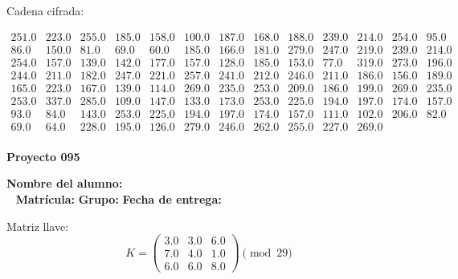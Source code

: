 \documentclass[12pt]{article}
\begin{document}
Cadena cifrada:
\begin{center}
$\begin{array}{lllllllllllll}
251.0 & 223.0 & 255.0 & 185.0 & 158.0 & 100.0 & 187.0 & 168.0 & 188.0 & 239.0 & 214.0 & 254.0 & 95.0\\
86.0 & 150.0 & 81.0 & 69.0 & 60.0 & 185.0 & 166.0 & 181.0 & 279.0 & 247.0 & 219.0 & 239.0 & 214.0\\
254.0 & 157.0 & 139.0 & 142.0 & 177.0 & 157.0 & 128.0 & 185.0 & 153.0 & 77.0 & 319.0 & 273.0 & 196.0\\
244.0 & 211.0 & 182.0 & 247.0 & 221.0 & 257.0 & 241.0 & 212.0 & 246.0 & 211.0 & 186.0 & 156.0 & 189.0\\
165.0 & 223.0 & 167.0 & 139.0 & 114.0 & 269.0 & 235.0 & 253.0 & 209.0 & 186.0 & 199.0 & 269.0 & 235.0\\
253.0 & 337.0 & 285.0 & 109.0 & 147.0 & 133.0 & 173.0 & 253.0 & 225.0 & 194.0 & 197.0 & 174.0 & 157.0\\
93.0 & 84.0 & 143.0 & 253.0 & 225.0 & 194.0 & 197.0 & 174.0 & 157.0 & 111.0 & 102.0 & 206.0 & 82.0\\
69.0 & 64.0 & 228.0 & 195.0 & 126.0 & 279.0 & 246.0 & 262.0 & 255.0 & 227.0 & 269.0\\
\end{array}$
\end{center}

\newpage


\textbf{Proyecto 095}

\textbf{Nombre del alumno:} \underline{\hspace{13cm}}\\\
\vspace{1cm}
\textbf{Matrícula:} \underline{\hspace{4cm}} \hspace{1cm}
\textbf{Grupo:} \underline{\hspace{2cm}}
\textbf{Fecha de entrega:} \underline{\hspace{2cm}}

\medskip

Matriz llave:
\[
K = \begin{pmatrix}
3.0 & 3.0 & 6.0\\
7.0 & 4.0 & 1.0\\
6.0 & 6.0 & 8.0
\end{pmatrix} \pmod{29}
\]
\end{document}
